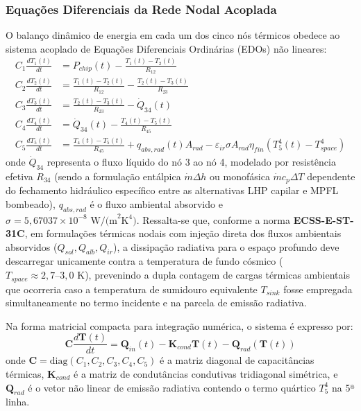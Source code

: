 \subsubsection{Equações Diferenciais da Rede Nodal Acoplada}

O balanço dinâmico de energia em cada um dos cinco nós térmicos obedece ao sistema acoplado de Equações Diferenciais Ordinárias (EDOs) não lineares:
\begin{align}
    C_1 \frac{dT_1(t)}{dt} &= P_{chip}(t) - \frac{T_1(t) - T_2(t)}{R_{12}} \label{eq:edo_no1} \\[0.2cm]
    C_2 \frac{dT_2(t)}{dt} &= \frac{T_1(t) - T_2(t)}{R_{12}} - \frac{T_2(t) - T_3(t)}{R_{23}} \label{eq:edo_no2} \\[0.2cm]
    C_3 \frac{dT_3(t)}{dt} &= \frac{T_2(t) - T_3(t)}{R_{23}} - \dot{Q}_{34}(t) \label{eq:edo_no3} \\[0.2cm]
    C_4 \frac{dT_4(t)}{dt} &= \dot{Q}_{34}(t) - \frac{T_4(t) - T_5(t)}{R_{45}} \label{eq:edo_no4} \\[0.2cm]
    C_5 \frac{dT_5(t)}{dt} &= \frac{T_4(t) - T_5(t)}{R_{45}} + q_{abs,rad}(t) A_{rad} - \varepsilon_{ir} \sigma A_{rad} \eta_{fin} \left( T_5^4(t) - T_{space}^4 \right) \label{eq:edo_no5}
\end{align}
onde $\dot Q_{34}$ representa o fluxo líquido do nó 3 ao nó 4, modelado por resistência efetiva $R_{34}$ (sendo a formulação entálpica $\dot m \Delta h$ ou monofásica $\dot m c_p \Delta T$ dependente do fechamento hidráulico específico entre as alternativas LHP capilar e MPFL bombeado), $q_{abs,rad}$ é o fluxo ambiental absorvido e $\sigma=5{,}67037\times10^{-8}\text{ W/(m}^2\text{K}^4)$. Ressalta-se que, conforme a norma \textbf{ECSS-E-ST-31C}, em formulações térmicas nodais com injeção direta dos fluxos ambientais absorvidos ($Q_{sol}, Q_{alb}, Q_{ir}$), a dissipação radiativa para o espaço profundo deve descarregar unicamente contra a temperatura de fundo cósmico ($T_{space} \approx 2{,}7\text{--}3{,}0\text{ K}$), prevenindo a dupla contagem de cargas térmicas ambientais que ocorreria caso a temperatura de sumidouro equivalente $T_{sink}$ fosse empregada simultaneamente no termo incidente e na parcela de emissão radiativa.

Na forma matricial compacta para integração numérica, o sistema é expresso por:
\begin{equation}
    \mathbf{C} \frac{d\mathbf{T}(t)}{dt} = \mathbf{Q}_{in}(t) - \mathbf{K}_{cond} \mathbf{T}(t) - \mathbf{Q}_{rad}(\mathbf{T}(t))
    \label{eq:forma_matricial_termica}
\end{equation}
onde $\mathbf{C} = \text{diag}(C_1, C_2, C_3, C_4, C_5)$ é a matriz diagonal de capacitâncias térmicas, $\mathbf{K}_{cond}$ é a matriz de condutâncias condutivas tridiagonal simétrica, e $\mathbf{Q}_{rad}$ é o vetor não linear de emissão radiativa contendo o termo quártico $T_5^4$ na 5ª linha.

